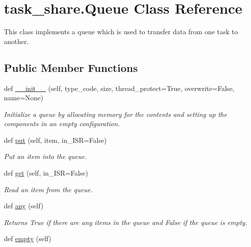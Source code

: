 \hypertarget{classtask__share_1_1Queue}{}\section{task\+\_\+share.\+Queue Class Reference}
\label{classtask__share_1_1Queue}


This class implements a queue which is used to transfer data from one task to another.  


\subsection*{Public Member Functions}
\begin{DoxyCompactItemize}
\item 
def \hyperlink{classtask__share_1_1Queue_a91ce05bf47c2634013fdb2689c2b207f}{\+\_\+\+\_\+init\+\_\+\+\_\+} (self, type\+\_\+code, size, thread\+\_\+protect=True, overwrite=False, name=None)
\begin{DoxyCompactList}\small\item\em Initialize a queue by allocating memory for the contents and setting up the components in an empty configuration. \end{DoxyCompactList}\item 
def \hyperlink{classtask__share_1_1Queue_ae785bdf9d397d61729c22656471a81df}{put} (self, item, in\+\_\+\+I\+SR=False)
\begin{DoxyCompactList}\small\item\em Put an item into the queue. \end{DoxyCompactList}\item 
def \hyperlink{classtask__share_1_1Queue_af2aef1dd3eed21c4b6c2e601cb8497d4}{get} (self, in\+\_\+\+I\+SR=False)
\begin{DoxyCompactList}\small\item\em Read an item from the queue. \end{DoxyCompactList}\item 
def \hyperlink{classtask__share_1_1Queue_a7cb2d23978b90a232cf9cea4cc0ccb6b}{any} (self)
\begin{DoxyCompactList}\small\item\em Returns {\ttfamily True} if there are any items in the queue and {\ttfamily False} if the queue is empty. \end{DoxyCompactList}\item 
def \hyperlink{classtask__share_1_1Queue_af9ada059fc09a44adc9084901e2f7266}{empty} (self)

\end{DoxyCompactItemize}
